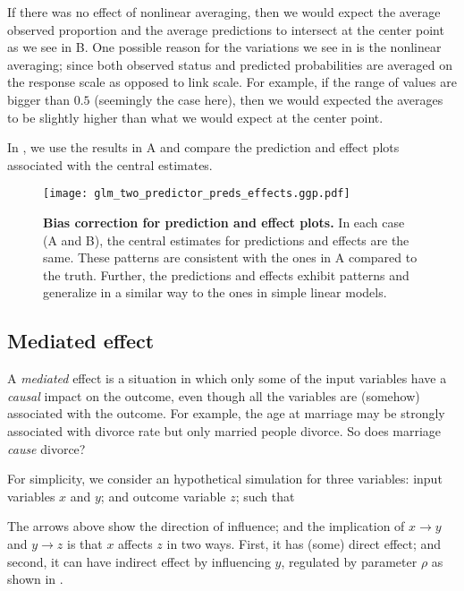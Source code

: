 If there was no effect of nonlinear averaging, then we would expect the average observed proportion and the average predictions to intersect at the center point as we see in B. One possible reason for the variations we see in  is the nonlinear averaging; since both observed status and predicted probabilities are averaged on the response scale as opposed to link scale. For example, if the range of values are bigger than $0.5$ (seemingly the case here), then we would expected the averages to be slightly higher than what we would expect at the center point.

In , we use the results in A and compare the prediction and effect plots associated with the central estimates. 

\begin{figure}
\begin{center}
\texttt{[image: glm\_two\_predictor\_preds\_effects.ggp.pdf]}
\end{center}
\caption{{\bf Bias correction for prediction and effect plots.} In each case (A and B), the central estimates for predictions and effects are the same. These patterns are  consistent with the ones in A compared to the truth. Further, the predictions and effects exhibit patterns and generalize in a similar way to the ones in simple linear models.
}
\label{fig:pred_bin_prediction_effects_plots}
\end{figure}


\subsection{Mediated effect}

A \emph{mediated} effect is a situation in which only some of the input variables have a \emph{causal} impact on the outcome, even though all the variables are (somehow) associated with the outcome. For example, the age at marriage may be strongly associated with divorce rate but only married people divorce. So does marriage \emph{cause} divorce?

For simplicity, we consider an hypothetical simulation for three variables: input variables $x$ and $y$; and outcome variable $z$; such that
%
\begin{center}
\end{center}
%
The arrows above show the direction of influence; and the implication of $x\rightarrow y$ and $y \rightarrow z$ is that $x$ affects $z$ in two ways. First, it has (some) direct effect; and second, it can have indirect effect by influencing $y$, regulated by parameter $\rho$ as shown in .

